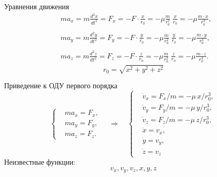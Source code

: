 \documentclass[12pt, compress]{beamer}
\begin{document}
\begin{frame}[fragile]{Уравнения движения}
$$
\begin{aligned}
  & \boxed{m a_x} = m \frac{d^2 x}{dt^2} = F_x = - F \cdot \frac{x}{r_0} = - \mu \frac{m}{r_0^2} \; \frac{x}{r_0} = \boxed{- \mu \frac{m \cdot x}{r_0^3}}, \\
  & \\
  & \boxed{m a_y} = m \frac{d^2 y}{dt^2} = F_y = - F \cdot \frac{y}{r_0} = - \mu \frac{m}{r_0^2} \; \frac{y}{r_0} = \boxed{- \mu \frac{m \cdot y}{r_0^3}}, \\
  & \\
  & \boxed{m a_z} = m \frac{d^2 z}{dt^2} = F_z = - F \cdot \frac{z}{r_0} = - \mu \frac{m}{r_0^2} \; \frac{z}{r_0} = \boxed{- \mu \frac{m \cdot z}{r_0^3}}.
\end{aligned}
$$
$$
r_0 = \sqrt{x^2 + y^2 + z^2}
$$
\end{frame}


\begin{frame}[fragile]{Приведение к ОДУ первого порядка}
$$
\left\{
\begin{aligned}
  & m a_x = F_x, \\
  & m a_y = F_y, \\
  & m a_z = F_z.
\end{aligned}\right. \quad \Rightarrow \quad
\left\{
\begin{aligned}
  & \dot v_x = F_x/m = - \mu \, x / r_0^3, \\
  & \dot v_y = F_y/m = - \mu \, y / r_0^3, \\
  & \dot v_z = F_z/m = - \mu \, z / r_0^3, \\
  & \dot x = v_x, \\
  & \dot y = v_y, \\
  & \dot z = v_z 
\end{aligned}
\right.
$$
Неизвестные функции: 
$$
  v_x, v_y, v_z, x, y, z
$$
\end{frame}
\end{document}
